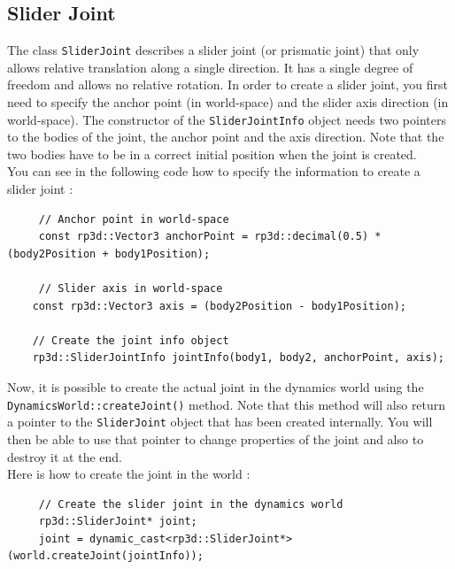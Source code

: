 \documentclass[a4paper,12pt]{article}
\begin{document}
    \subsection{Slider Joint}

    The class \texttt{SliderJoint} describes a slider joint (or prismatic joint) that only allows relative translation along a single direction. It has a single degree of freedom and allows no
    relative rotation. In order to create a slider joint, you first need to specify the anchor point (in world-space) and the slider axis direction (in world-space). The constructor of the
    \texttt{SliderJointInfo} object needs two pointers to the bodies of the joint, the anchor point and the axis direction. Note that the two bodies have to be in a correct initial position when
    the joint is created. \\

    You can see in the following code how to specify the information to create a slider joint : \\

    \begin{lstlisting}
     // Anchor point in world-space
     const rp3d::Vector3 anchorPoint = rp3d::decimal(0.5) * (body2Position + body1Position);

     // Slider axis in world-space
    const rp3d::Vector3 axis = (body2Position - body1Position);

    // Create the joint info object
    rp3d::SliderJointInfo jointInfo(body1, body2, anchorPoint, axis);
  \end{lstlisting}

    \vspace{0.6cm}

    Now, it is possible to create the actual joint in the dynamics world using the \texttt{DynamicsWorld::createJoint()} method.
    Note that this method will also return a pointer to the \texttt{SliderJoint} object that has been created internally. You will then
    be able to use that pointer to change properties of the joint and also to destroy it at the end. \\

    Here is how to create the joint in the world : \\

    \begin{lstlisting}
     // Create the slider joint in the dynamics world
     rp3d::SliderJoint* joint;
     joint = dynamic_cast<rp3d::SliderJoint*>(world.createJoint(jointInfo));
  \end{lstlisting}
\end{document}
